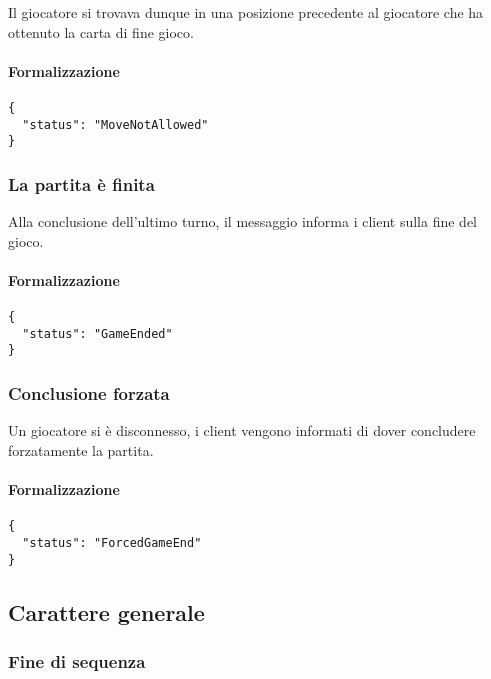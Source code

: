 \documentclass[a4paper,11pt]{article} %
\begin{document}
    Il giocatore si trovava dunque in una posizione precedente al giocatore che ha ottenuto la carta di fine gioco.

    \paragraph{Formalizzazione}
    \begin{verbatim}
{
  "status": "MoveNotAllowed"
}
    \end{verbatim}

    \newpage

    \subsubsection{La partita è finita}
    Alla conclusione dell'ultimo turno, il messaggio informa i client sulla fine del gioco.

    \paragraph{Formalizzazione}
    \begin{verbatim}
{
  "status": "GameEnded"
}
    \end{verbatim}

    \subsubsection{Conclusione forzata}
    Un giocatore si è disconnesso, i client vengono informati di dover concludere forzatamente la partita.

    \paragraph{Formalizzazione}
    \begin{verbatim}
{
  "status": "ForcedGameEnd"
}
    \end{verbatim}

    \newpage

    \subsection{Carattere generale}\label{subsec:carattere-generale}

    \subsubsection{Fine di sequenza}
\end{document}
